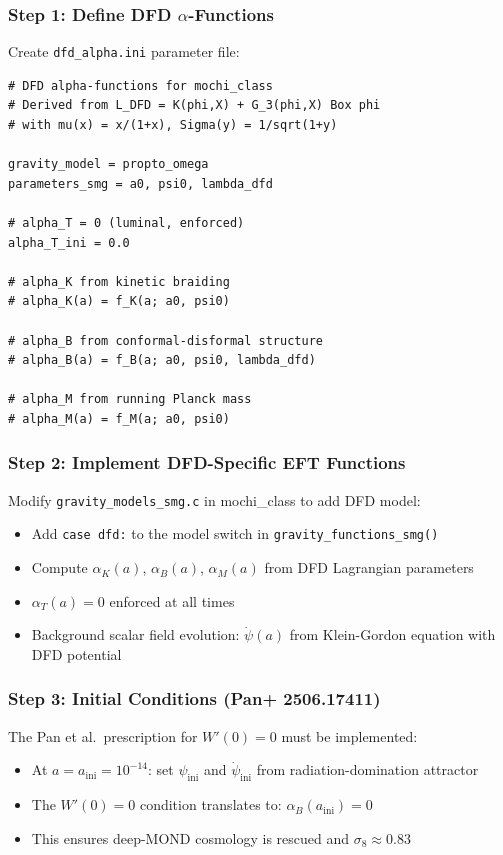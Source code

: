 \documentclass[11pt,a4paper]{article}
\begin{document}
\subsubsection{Step 1: Define DFD $\alpha$-Functions}

Create \texttt{dfd\_alpha.ini} parameter file:
\begin{verbatim}
# DFD alpha-functions for mochi_class
# Derived from L_DFD = K(phi,X) + G_3(phi,X) Box phi
# with mu(x) = x/(1+x), Sigma(y) = 1/sqrt(1+y)

gravity_model = propto_omega
parameters_smg = a0, psi0, lambda_dfd

# alpha_T = 0 (luminal, enforced)
alpha_T_ini = 0.0

# alpha_K from kinetic braiding
# alpha_K(a) = f_K(a; a0, psi0)

# alpha_B from conformal-disformal structure
# alpha_B(a) = f_B(a; a0, psi0, lambda_dfd)

# alpha_M from running Planck mass
# alpha_M(a) = f_M(a; a0, psi0)
\end{verbatim}

\subsubsection{Step 2: Implement DFD-Specific EFT Functions}

Modify \texttt{gravity\_models\_smg.c} in mochi\_class to add DFD model:
\begin{itemize}
\item Add \texttt{case dfd:} to the model switch in \texttt{gravity\_functions\_smg()}
\item Compute $\alpha_K(a)$, $\alpha_B(a)$, $\alpha_M(a)$ from DFD Lagrangian parameters
\item $\alpha_T(a) = 0$ enforced at all times
\item Background scalar field evolution: $\dot{\psi}(a)$ from Klein-Gordon equation with DFD potential
\end{itemize}

\subsubsection{Step 3: Initial Conditions (Pan+ 2506.17411)}

The Pan et al.\ prescription for $W'(0) = 0$ must be implemented:
\begin{itemize}
\item At $a = a_\mathrm{ini} = 10^{-14}$: set $\psi_\mathrm{ini}$ and $\dot{\psi}_\mathrm{ini}$ from radiation-domination attractor
\item The $W'(0) = 0$ condition translates to: $\alpha_B(a_\mathrm{ini}) = 0$
\item This ensures deep-MOND cosmology is rescued and $\sigma_8 \approx 0.83$
\end{itemize}
\end{document}
